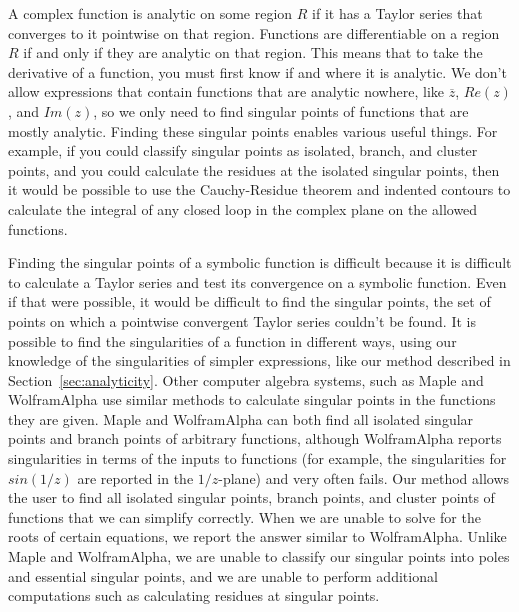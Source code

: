 A complex function is analytic on some region $R$ if it has a Taylor series that converges to it pointwise on that region. Functions are differentiable on a region $R$ if and only if they are analytic on that region. This means that to take the derivative of a function, you must first know if and where it is analytic. We don't allow expressions that contain functions that are analytic nowhere, like $\overline z$, $Re(z)$, and $Im(z)$, so we only need to find singular points of functions that are mostly analytic. Finding these singular points enables various useful things. For example, if you could classify singular points as isolated, branch, and cluster points, and you could calculate the residues at the isolated singular points, then it would be possible to use the Cauchy-Residue theorem and indented contours to calculate the integral of any closed loop in the complex plane on the allowed functions.

Finding the singular points of a symbolic function is difficult because it is difficult to calculate a Taylor series and test its convergence on a symbolic function. Even if that were possible, it would be difficult to find the singular points, the set of points on which a pointwise convergent Taylor series couldn't be found. It is possible to find the singularities of a function in different ways, using our knowledge of the singularities of simpler expressions, like our method described in Section~\ref{sec:analyticity}. Other computer algebra systems, such as Maple and WolframAlpha use similar methods to calculate singular points in the functions they are given. Maple and WolframAlpha can both find all isolated singular points and branch points of arbitrary functions, although WolframAlpha reports singularities in terms of the inputs to functions (for example, the singularities for $sin(1/z)$ are reported in the $1/z$-plane) and very often fails. Our method allows the user to find all isolated singular points, branch points, and cluster points of functions that we can simplify correctly. When we are unable to solve for the roots of certain equations, we report the answer similar to WolframAlpha. Unlike Maple and WolframAlpha, we are unable to classify our singular points into poles and essential singular points, and we are unable to perform additional computations such as calculating residues at singular points.
